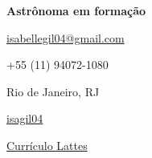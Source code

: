 \documentclass[11pt]{spidercv}
\begin{document}
    \begin{TopBar}{\ColorTextSide}
    \vspace*{0.5cm}
    

        \large{\textbf{Astrônoma em formação}}
        

        \vspace*{0.5cm}
    
        

        \begin{DoubleColumns}
            \begin{ItemList}{\ColorHighlight}
                \item [\color{Mahogany}\Large\faAt] \href{mailto:isabellegil04@gmail.com}{isabellegil04@gmail.com}
                \item [\color{Mahogany}\Large\faMobile] +55 (11) 94072-1080
                \item [\color{Mahogany}\Large\faMapMarker] Rio de Janeiro, RJ
            \end{ItemList}
            \nextcolumn
            \begin{ItemList}{\ColorHighlight}
                \item [\color{Mahogany}\Large\faGithub] \href{https://github.com/isagil04}{isagil04}
                \item [\color{Mahogany}\Large\faUser] \href{https://lattes.cnpq.br/2286179596994894}{Currículo Lattes}
            \end{ItemList}
        \end{DoubleColumns}


    
    \end{TopBar}
\end{document}
